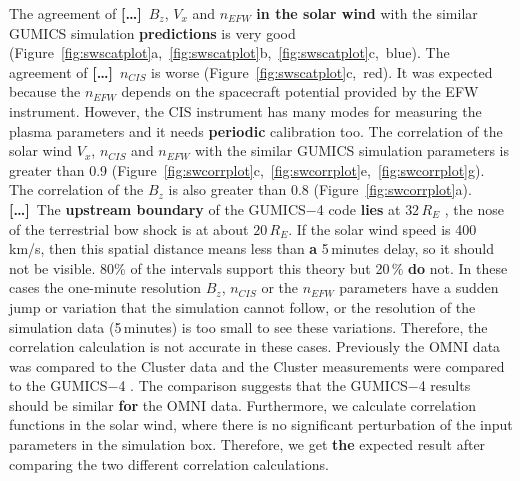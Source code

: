 \documentclass[linenumbers,draft]{agujournal}
\newcommand{\del}{\textbf{[\dots]}\ } %
\begin{document}
The agreement of \del $B_{z}$, $V_{x}$ and $n_{EFW}$ \textbf{in the solar wind} with the similar GUMICS simulation \textbf{predictions} is very good (Figure~\ref{fig:swscatplot}a,~\ref{fig:swscatplot}b,~\ref{fig:swscatplot}c,~blue). The agreement of \del $n_{CIS}$ is worse (Figure~\ref{fig:swscatplot}c,~red). It was expected because the $n_{EFW}$ depends on the spacecraft potential provided by the EFW instrument. However, the CIS instrument has many modes for measuring the plasma parameters and it needs \textbf{periodic} calibration too. The correlation of the solar wind $V_{x}$,  $n_{CIS}$ and $n_{EFW}$ with the similar GUMICS simulation parameters is greater than 0.9 (Figure~\ref{fig:swcorrplot}c,~\ref{fig:swcorrplot}e,~\ref{fig:swcorrplot}g). The correlation of the $B_{z}$ is also greater than 0.8 (Figure~\ref{fig:swcorrplot}a). \del The \textbf{upstream boundary} of the GUMICS$-$4 code \textbf{lies} at $32\,R_E$ \citep{janhunen12:_gumic_mhd}, the nose of the terrestrial bow shock is at about $20\,R_E$. If the solar wind speed is 400\,km/s, then this spatial distance means less than \textbf{a} 5\,minutes delay, so it should not be visible. 80\% of the intervals support this theory but 20\,\% \textbf{do} not. In these cases the one-minute resolution $B_z$, $n_{CIS}$ or the $n_{EFW}$ parameters have a sudden jump or variation that the simulation cannot follow, or the resolution of the simulation data (5\,minutes) is too small to see these variations. Therefore, the correlation calculation is not accurate in these cases. Previously the OMNI data was compared to the Cluster data and the Cluster measurements were compared to the GUMICS$-$4 \citep{facsko16:_one_earth}. The comparison suggests that the GUMICS$-$4 results should be similar \textbf{for} the OMNI data. Furthermore, we calculate correlation functions in the solar wind, where there is no significant perturbation of the input parameters in the simulation box. Therefore, we get \textbf{the} expected result after comparing the two different correlation calculations.
\end{document}
